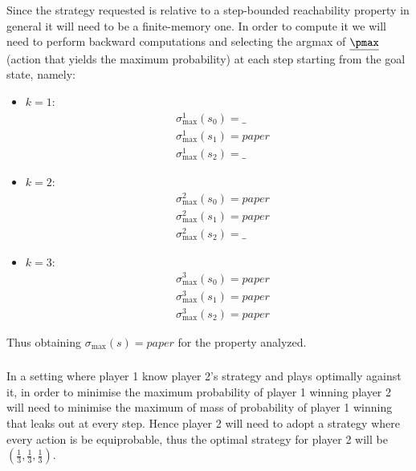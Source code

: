 Since the strategy requested is relative to a step-bounded reachability
property in general it will need to be a finite-memory one.
In order to compute it we will need to perform backward computations and
selecting the argmax of $\underline{\pmax}$ (action that yields the maximum
probability) at each step starting from the goal state, namely:
\begin{itemize}
	\item $k=1$:
	      \begin{align*}
		       & \sigma_{\max}^1(s_0) = \_    \\
		       & \sigma_{\max}^1(s_1) = paper \\
		       & \sigma_{\max}^1(s_2) = \_
	      \end{align*}
	\item $k=2$:
	      \begin{align*}
		       & \sigma_{\max}^2(s_0) = paper \\
		       & \sigma_{\max}^2(s_1) = paper \\
		       & \sigma_{\max}^2(s_2) = \_
	      \end{align*}
	\item $k=3$:
	      \begin{align*}
		       & \sigma_{\max}^3(s_0) = paper \\
		       & \sigma_{\max}^3(s_1) = paper \\
		       & \sigma_{\max}^3(s_2) = paper
	      \end{align*}
\end{itemize}

Thus obtaining $\sigma_{\max}(s) = paper$ for the property analyzed.


\subsubsection{}

In a setting where player 1 know player 2's strategy and plays optimally
against it, in order to minimise the maximum probability of player 1 winning
player 2 will need to minimise the maximum of mass of probability of player 1
winning that leaks out at every step.
Hence player 2 will need to adopt a strategy where every
action is be equiprobable, thus the optimal strategy for player 2 will be
$(\frac{1}{3}, \frac{1}{3}, \frac{1}{3})$.
